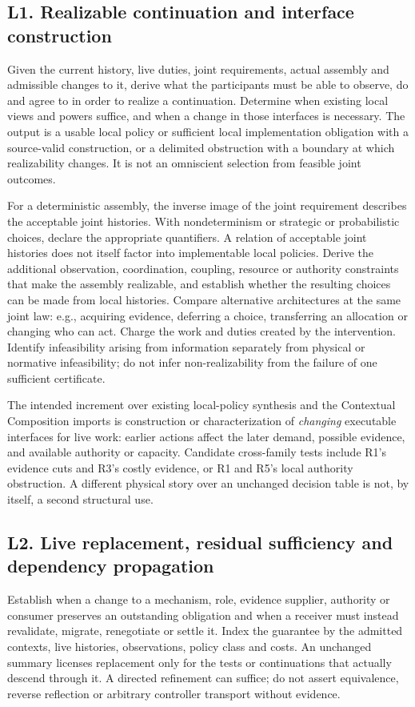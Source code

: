 \documentclass[11pt]{article}
\begin{document}
\subsection*{L1. Realizable continuation and interface construction}
Given the current history, live duties, joint requirements, actual assembly and admissible changes to it, derive what the participants must be able to observe, do and agree to in order to realize a continuation. Determine when existing local views and powers suffice, and when a change in those interfaces is necessary. The output is a usable local policy or sufficient local implementation obligation with a source-valid construction, or a delimited obstruction with a boundary at which realizability changes. It is not an omniscient selection from feasible joint outcomes.

For a deterministic assembly, the inverse image of the joint requirement describes the acceptable joint histories. With nondeterminism or strategic or probabilistic choices, declare the appropriate quantifiers. A relation of acceptable joint histories does not itself factor into implementable local policies. Derive the additional observation, coordination, coupling, resource or authority constraints that make the assembly realizable, and establish whether the resulting choices can be made from local histories. Compare alternative architectures at the same joint law: e.g., acquiring evidence, deferring a choice, transferring an allocation or changing who can act. Charge the work and duties created by the intervention. Identify infeasibility arising from information separately from physical or normative infeasibility; do not infer non-realizability from the failure of one sufficient certificate.

The intended increment over existing local-policy synthesis and the Contextual Composition imports is construction or characterization of \emph{changing} executable interfaces for live work: earlier actions affect the later demand, possible evidence, and available authority or capacity. Candidate cross-family tests include R1's evidence cuts and R3's costly evidence, or R1 and R5's local authority obstruction. A different physical story over an unchanged decision table is not, by itself, a second structural use.

\subsection*{L2. Live replacement, residual sufficiency and dependency propagation}
Establish when a change to a mechanism, role, evidence supplier, authority or consumer preserves an outstanding obligation and when a receiver must instead revalidate, migrate, renegotiate or settle it. Index the guarantee by the admitted contexts, live histories, observations, policy class and costs. An unchanged summary licenses replacement only for the tests or continuations that actually descend through it. A directed refinement can suffice; do not assert equivalence, reverse reflection or arbitrary controller transport without evidence.
\end{document}
